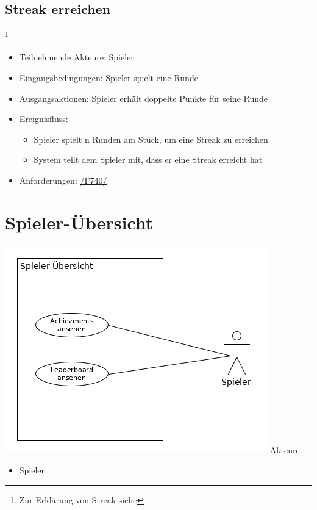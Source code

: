 \documentclass[a4paper]{scrreprt}
\begin{document}
    \subsection{Streak erreichen}\footnote{Zur Erklärung von Streak siehe }
    \begin{itemize}
        \item Teilnehmende Akteure: \Gls{Spieler}
        \item Eingangsbedingungen: \Gls{Spieler} spielt eine Runde
        \item Ausgangsaktionen: \Gls{Spieler} erhält doppelte Punkte für seine Runde
        \item Ereignisfluss:
        \begin{itemize}
            \item \Gls{Spieler} spielt n Runden am Stück, um eine Streak zu erreichen
            \item System teilt dem \Gls{Spieler} mit, dass er eine Streak erreicht hat
        \end{itemize}
        \item Anforderungen: \hyperlink{F740}{/F740/}
    \end{itemize}
    
    \section{Spieler-Übersicht}
    \includegraphics[width=\textwidth]{uml/export/Spieler_Ubersicht.png}
    Akteure: 
    \begin{itemize}
    \item \Gls{Spieler}
    \end{itemize}
\end{document}
